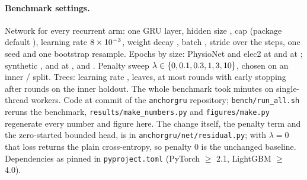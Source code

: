 \documentclass{article}
\begin{document}
\paragraph{Benchmark settings.} Network for every recurrent arm: one GRU layer, hidden size \nNetHidden, cap \nNetCap{} (package default
\nDefCap), learning rate $8\times10^{-3}$, weight decay \nNetWd, batch \nBatch, stride \nStride{} over the steps, one seed
and one bootstrap resample. Epochs by size: PhysioNet and elec2 \nPhysDEpochs{} at \nSizeD{} and \nPhysMMEpochs{} at \nSizeMM;
synthetic \nSynCCLEpochs, \nSynMEpochs{} and \nSynMMMMEpochs{} at \nSizeCCL, \nSizeM{} and \nSizeMMMM. Penalty
sweep $\lambda \in \{0, 0.1, 0.3, 1, 3, 10\}$, chosen on an inner \nInnerTrainPct/\nInnerPct{} split. Trees:
learning rate \nGbmLr, \nGbmLeaves{} leaves, at most \nGbmMaxRounds{} rounds with early stopping after \nGbmStop{}
rounds on the inner holdout. The whole benchmark took \nWallTotalMin{} minutes on \nWorkers{} single-thread
workers. Code at commit \nCommit{} of the \texttt{anchorgru} repository; \texttt{bench/run\_all.sh} reruns the
benchmark, \texttt{results/make\_numbers.py} and \texttt{figures/make.py} regenerate every number and figure here.
The change itself, the penalty term and the zero-started bounded head, is in \texttt{anchorgru/net/residual.py}; with $\lambda = 0$ that loss returns the plain cross-entropy, so penalty 0 is the unchanged baseline.
Dependencies as pinned in \texttt{pyproject.toml} (PyTorch \citep{paszke2019pytorch} $\geq$ 2.1, LightGBM $\geq$ 4.0).
\end{document}
